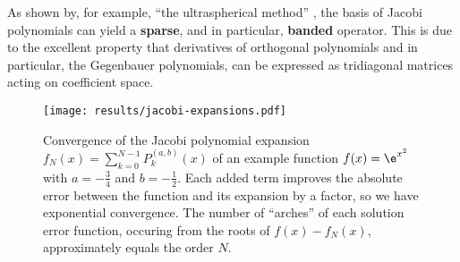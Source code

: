 As shown by, for example, ``the ultraspherical method'' \parencite{2013-a-fast-and-well-conditioned-spectral-method}, the basis of Jacobi polynomials can yield a \textbf{sparse}, and in particular, \textbf{banded} operator.
This is due to the excellent property that derivatives of orthogonal polynomials and in particular, the Gegenbauer polynomials, can be expressed as tridiagonal matrices acting on coefficient space.

\begin{figure}[H]
  \centering
  \label{fig:jacobi-expansions-error}
  \texttt{[image: results/jacobi-expansions.pdf]}
  \caption[Convergence of Jacobi basis expansion]{Convergence of the Jacobi polynomial expansion $f_N(x) = \sum_{k=0}^{N-1} P_k^{(a, b)}(x)$ of an example function $f(x) = \e^{x^2}$ with $a = -\frac{3}{4}$ and $b = -\frac{1}{2}$. Each added term improves the absolute error between the function and its expansion by a factor, so we have exponential convergence. The number of ``arches'' of each solution error function, occuring from the roots of $f(x) - f_N(x)$, approximately equals the order $N$.}
\end{figure}


